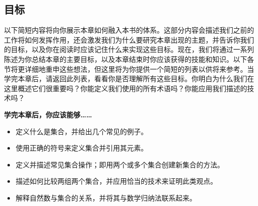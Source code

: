 \subsection{目标}

以下简短内容将向你展示本章如何融入本书的体系。这部分内容会描述我们之前的工作将如何发挥作用，还会激发我们为什么要研究本章出现的主题，并告诉你我们的目标，以及你在阅读时应该记住什么来实现这些目标。现在，我们将通过一系列陈述为你总结本章的主要目标，以及本章结束时你应该获得的技能和知识。以下各节将更详细地重申这些想法，但这里将为你提供一个简短的列表以供将来参考。当学完本章后，请返回此列表，看看你是否理解所有这些目标。你明白为什么我们在这里概述它们很重要吗？你能定义我们使用的所有术语吗？你能应用我们描述的技术吗？

\textbf{学完本章后，你应该能够……}

\begin{itemize}
    \item 定义什么是集合，并给出几个常见的例子。
    \item 使用正确的符号来定义集合并引用其元素。
    \item 定义并描述常见集合操作；即用两个或多个集合创建新集合的方法。
    \item 描述如何比较两组两个集合，并应用恰当的技术来证明此类观点。
    \item 解释自然数与集合的关系，并将其与数学归纳法联系起来。
\end{itemize}
